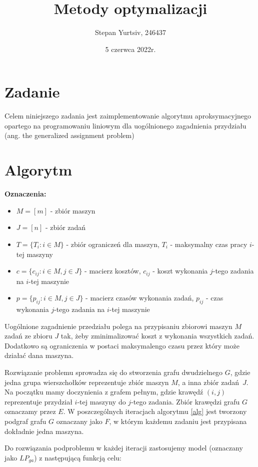 \documentclass[12pt, a4paper]{article}
\title{Metody optymalizacji}
\author{Stepan Yurtsiv, 246437}
\date{5 czerwca 2022r.}
\begin{document}
\maketitle

\section*{Zadanie}

Celem niniejszego zadania jest zaimplementowanie algorytmu
aproksymacyjnego opartego na programowaniu liniowym dla
uogólnionego zagadnienia przydziału (ang. the generalized assignment problem)

\section*{Algorytm}

\textbf{Oznaczenia:}
\begin{itemize}
  \item $M = [m]$ - zbiór maszyn
  \item $J = [n]$ - zbiór zadań
  \item $T = \{T_i: i \in M\}$ - zbiór ograniczeń dla maszyn, $T_i$ - maksymalny czas pracy $i$-tej maszyny
  \item $c = \{c_{ij}: i \in M, j \in J\}$ - macierz kosztów, $c_{ij}$ - koszt wykonania $j$-tego zadania na $i$-tej maszynie
  \item $p = \{p_{ij}: i \in M, j \in J\}$ - macierz czasów wykonania zadań, $p_{ij}$ - czas wykonania $j$-tego zadania na $i$-tej maszynie
\end{itemize}

Uogólnione zagadnienie przedziału polega na przypisaniu zbiorowi maszyn
$M$ zadań ze zbioru $J$ tak, żeby zminimalizować koszt z wykonania wszystkich
zadań. Dodatkowo są ograniczenia w postaci maksymalengo czasu przez który może
działać dana maszyna.

Rozwiązanie problemu sprowadza się do stworzenia grafu dwudzielnego
$G$, gdzie jedna grupa wierszchołków reprezentuje zbiór maszyn $M$, a inna
zbiór zadań $J$. Na początku mamy doczynienia z grafem pełnym, gdzie krawędź $(i, j)$ reprezentuje
przydział $i$-tej maszyny do $j$-tego zadania. Zbiór krawędzi
grafu $G$ oznaczamy przez $E$. W poszczególnych iteracjach
algorytmu \ref{alg} jest tworzony podgraf grafu $G$ oznaczany jako $F$, w którym
każdemu zadaniu jest przypisana dokładnie jedna maszyna.

Do rozwiązania podproblemu w każdej iteracji zastosujemy model (oznaczany jako $LP_{ga}$) z następującą 
funkcją celu:
\end{document}
